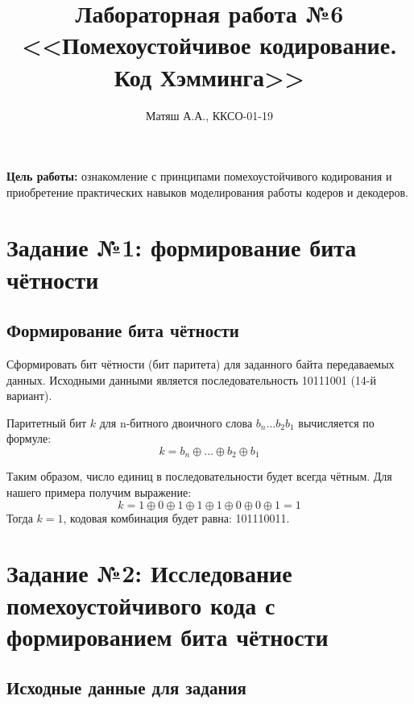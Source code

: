 \documentclass[14pt]{article}
\title{\textbf{Лабораторная работа №6\\<<Помехоустойчивое кодирование. Код Хэмминга>>}}
\author{Матяш А.А., ККСО-01-19}
\date{}
\begin{document}
\maketitle
\thispagestyle{empty}
\textbf{Цель работы:}  ознакомление с принципами помехоустойчивого кодирования и приобретение практических навыков моделирования работы кодеров и декодеров. 

\section{Задание №1: формирование бита чётности}

\subsection{Формирование бита чётности}
Сформировать бит чётности (бит паритета) для заданного байта передаваемых данных. Исходными данными является последовательность 10111001 (14-й вариант).

Паритетный бит $k$ для n-битного двоичного слова $b_n \ldots b_2 b_1$ вычисляется по формуле:
$$
k=b_n \oplus \ldots \oplus b_2 \oplus b_1
$$

Таким образом, число единиц в последовательности будет всегда чётным. Для нашего примера получим выражение:
$$
k= 1 \oplus 0 \oplus 1\oplus 1\oplus 1\oplus 0\oplus 0\oplus 1 = 1
$$
Тогда $k=1$, кодовая комбинация будет равна: 101110011.

\newpage

\section{Задание №2: Исследование помехоустойчивого кода с формированием бита чётности}

\subsection{Исходные данные для задания}
\end{document}
